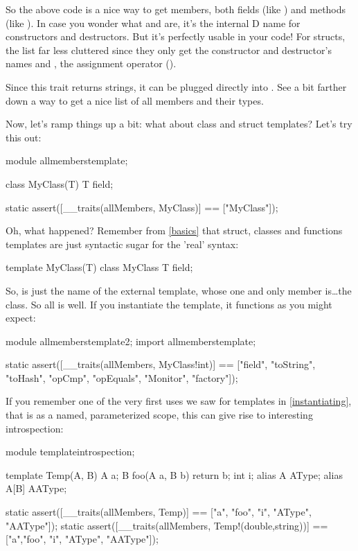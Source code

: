 So the above code is a nice way to get members, both fields (like ) and methods (like ). In case you wonder what  and  are, it's the internal D name for constructors and destructors. But it's perfectly usable in your code! For structs, the list far less cluttered since they only get the constructor and destructor's names and , the assignment operator (\DD{=}).

Since this trait returns strings, it can be plugged directly into . See a bit farther down a way to get a nice list of all members and their types.

Now, let's ramp things up a bit: what about class and struct templates? Let's try this out:

\begin{dcode}
module allmemberstemplate;

class MyClass(T)
{
    T field;
}

static assert([__traits(allMembers, MyClass)] == ["MyClass"]);
\end{dcode}

Oh, what happened? Remember from \autoref{basics} that struct, classes and functions templates are just syntactic sugar for the 'real' syntax:

\begin{dcode}
template MyClass(T)
{
    class MyClass
    {
        T field;
    }
}
\end{dcode}

So,  is just the name of the external template, whose one and only member is\ldots the  class. So all is well. If you instantiate the template, it functions as you might expect:

\begin{dcode}
module allmemberstemplate2;
import allmemberstemplate;

static assert([__traits(allMembers, MyClass!int)] 
           == ["field", "toString", "toHash", "opCmp", 
               "opEquals", "Monitor", "factory"]);
\end{dcode}

If you remember one of the very first uses we saw for templates in \ref{instantiating}, that is as a named, parameterized scope, this can give rise to interesting introspection:

\begin{dcode}
module templateintrospection;

template Temp(A, B)
{
    A a;
    B foo(A a, B b) { return b;}
    int i;
    alias A    AType;
    alias A[B] AAType;
}

static assert([__traits(allMembers, Temp)] 
           == ["a", "foo", "i", "AType", "AAType"]);
static assert([__traits(allMembers, Temp!(double,string))] 
           == ["a","foo", "i", "AType", "AAType"]);
\end{dcode} 


